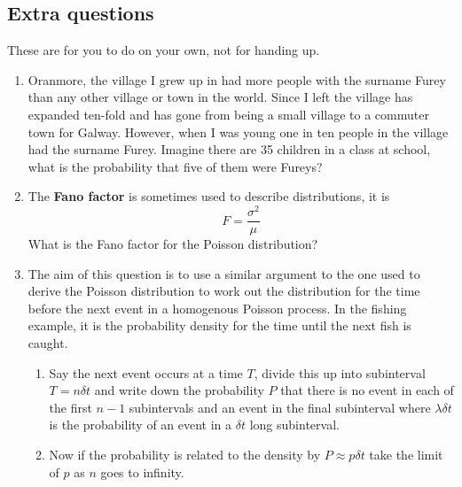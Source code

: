 \documentclass[11pt,a4paper]{scrartcl}
\begin{document}
\subsection*{Extra questions}
These are for you to do on your own, not for handing up.

\begin{enumerate}

\item Oranmore, the village I grew up in had more people with the
  surname Furey than any other village or town in the world. Since I
  left the village has expanded ten-fold and has gone from being a
  small village to a commuter town for Galway. However, when I was young
  one in ten people in the village had the surname Furey. Imagine
  there are 35 children in a class at school, what is the probability
  that five of them were Fureys?

\item The \textbf{Fano factor} is sometimes used to describe distributions, it is
  \begin{equation}
    F=\frac{\sigma^2}{\mu}
  \end{equation}
What is the Fano factor for the Poisson distribution?



\item The aim of this question is to use a similar argument to the one
  used to derive the Poisson distribution to work out the distribution
  for the time before the next event in a homogenous Poisson
  process. In the fishing example, it is the probability density for
  the time until the next fish is caught.
  \begin{enumerate}
    \item Say the next event occurs at a time $T$, divide this up into
      subinterval $T=n\delta t$ and write down the probability $P$ that
      there is no event in each of the first $n-1$ subintervals and an
      event in the final subinterval where $\lambda\delta t$ is the
      probability of an event in a $\delta t$ long subinterval.
    \item Now if the probability is related to the density by $P\approx p\delta t$ take the limit of $p$ as $n$ goes to infinity.
      \end{enumerate}

\end{enumerate}
  
  
\end{document}
